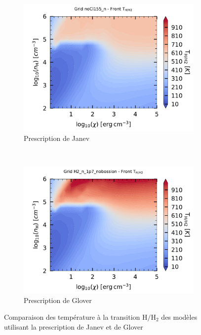 \begin{figure}[!h]
    \centering
    \begin{subfigure}[t]{0.49\textwidth} %
        \centering \includegraphics[trim = {0 0 0 1cm },clip,width=1\textwidth]{figure/H2/grid_janev/HH2_T.pdf}
        \caption{Prescription de Janev}
    \end{subfigure}
    ~ 
    \begin{subfigure}[t]{0.49\textwidth}
        \centering \includegraphics[trim = {0 0 0 1cm },clip,width=1\textwidth]{figure/H2/grid_glover/HH2_T.pdf}
        \caption{Prescription de Glover}
    \end{subfigure}
    \caption{Comparaison des température à la transition $\mathrm{H}/\mathrm{H}_2$ des modèles utilisant la prescription de Janev et de Glover}
    \label{fig:H2:JanevGlover:THH2}
\end{figure}

